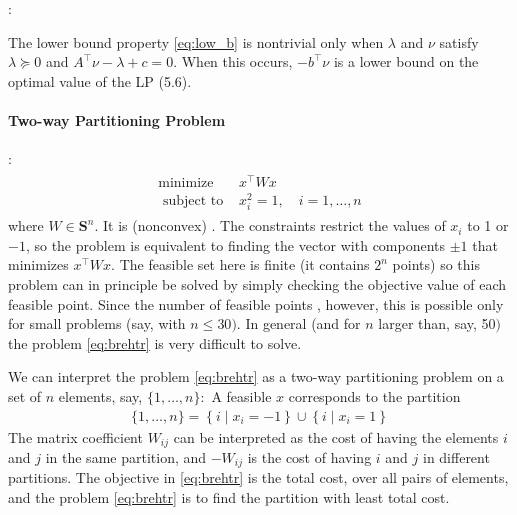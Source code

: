 \documentclass{article}
\begin{document}
:

The lower bound property \cref{eq:low_b} is nontrivial only when $\lambda$ and $\nu$ satisfy $\lambda \succeq 0$ and $A^{\top} \nu-\lambda+c=0 .$ When this occurs, $-b^{\top} \nu$ is a lower bound on the optimal value of the LP (5.6).
\paragraph{Two-way Partitioning Problem}
:
\begin{align}
\begin{array}{ll}
\operatorname{minimize} & x^{\top} W x \\
\text { subject to } & x_{i}^{2}=1, \quad i=1, \ldots, n
\end{array}\label{eq:brehtr}
\end{align}
where $W \in \mathbf{S}^{n} .$  It is (nonconvex) . The constraints restrict the values of $x_{i}$ to 1 or $-1$, so the problem is equivalent to finding the vector with components $\pm 1$ that minimizes $x^{\top} W x .$ The feasible set here is finite (it contains $2^{n}$ points) so this problem can in principle be solved by simply checking the objective value of each feasible point. Since the number of feasible points , however, this is possible only for small problems (say, with $n \leq 30)$. In general (and for $n$ larger than, say, 50$)$ the problem \cref{eq:brehtr} is very difficult to solve.

We can interpret the problem \cref{eq:brehtr} as a two-way partitioning problem on a set of $n$ elements, say, $\{1, \ldots, n\}:$ A feasible $x$ corresponds to the partition
\begin{align*}
\{1, \ldots, n\}=\left\{i \mid x_{i}=-1\right\} \cup\left\{i \mid x_{i}=1\right\}
\end{align*}
The matrix coefficient $W_{i j}$ can be interpreted as the cost of having the elements $i$ and $j$ in the same partition, and $-W_{i j}$ is the cost of having $i$ and $j$ in different partitions. The objective in \cref{eq:brehtr} is the total cost, over all pairs of elements, and the problem \cref{eq:brehtr} is to find the partition with least total cost.
\end{document}
